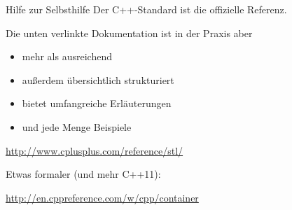 \begin{frame}{Hilfe zur Selbsthilfe}
	Der C++-Standard ist die offizielle Referenz. 
	
	Die unten verlinkte Dokumentation ist in der Praxis aber
	\begin{itemize}
		\item mehr als ausreichend
		\item außerdem übersichtlich strukturiert
		\item bietet umfangreiche Erläuterungen
		\item und jede Menge Beispiele
	\end{itemize}
	
	\begin{center}
		\url{http://www.cplusplus.com/reference/stl/}
	\end{center}
	
	Etwas formaler (und mehr C++11):
	\begin{center}
		\url{http://en.cppreference.com/w/cpp/container}
	\end{center}
\end{frame}

